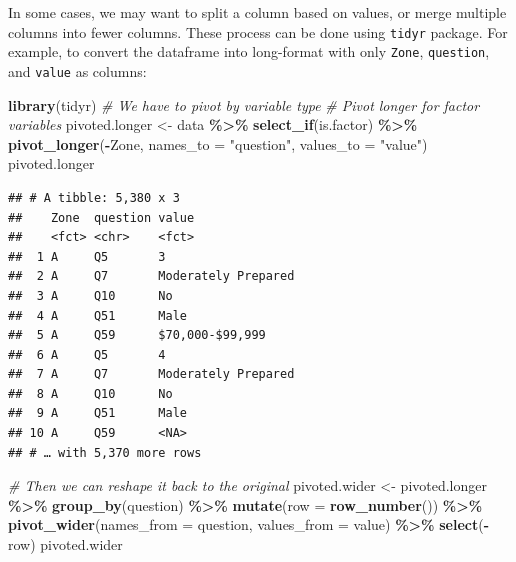 \documentclass[
]{book}
\newenvironment{Shaded}{\begin{snugshade}}{\end{snugshade}}
\newcommand{\CommentTok}[1]{\textcolor[rgb]{0.56,0.35,0.01}{\textit{#1}}}
\newcommand{\DataTypeTok}[1]{\textcolor[rgb]{0.13,0.29,0.53}{#1}}
\newcommand{\KeywordTok}[1]{\textcolor[rgb]{0.13,0.29,0.53}{\textbf{#1}}}
\newcommand{\NormalTok}[1]{#1}
\newcommand{\OperatorTok}[1]{\textcolor[rgb]{0.81,0.36,0.00}{\textbf{#1}}}
\newcommand{\StringTok}[1]{\textcolor[rgb]{0.31,0.60,0.02}{#1}}
\begin{document}
In some cases, we may want to split a column based on values, or merge multiple columns into fewer columns. These process can be done using \texttt{tidyr} package. For example, to convert the dataframe into long-format with only \texttt{Zone}, \texttt{question}, and \texttt{value} as columns:

\begin{Shaded}
\begin{Highlighting}[]
\KeywordTok{library}\NormalTok{(tidyr)}
\CommentTok{\# We have to pivot by variable type}
\CommentTok{\# Pivot longer for factor variables}
\NormalTok{pivoted.longer \textless{}{-}}\StringTok{ }\NormalTok{data }\OperatorTok{\%\textgreater{}\%}\StringTok{ }
\StringTok{  }\KeywordTok{select\_if}\NormalTok{(is.factor) }\OperatorTok{\%\textgreater{}\%}\StringTok{ }
\StringTok{  }\KeywordTok{pivot\_longer}\NormalTok{(}\OperatorTok{{-}}\NormalTok{Zone, }\DataTypeTok{names\_to =} \StringTok{"question"}\NormalTok{, }\DataTypeTok{values\_to =} \StringTok{"value"}\NormalTok{)}
\NormalTok{pivoted.longer}
\end{Highlighting}
\end{Shaded}

\begin{verbatim}
## # A tibble: 5,380 x 3
##    Zone  question value              
##    <fct> <chr>    <fct>              
##  1 A     Q5       3                  
##  2 A     Q7       Moderately Prepared
##  3 A     Q10      No                 
##  4 A     Q51      Male               
##  5 A     Q59      $70,000-$99,999    
##  6 A     Q5       4                  
##  7 A     Q7       Moderately Prepared
##  8 A     Q10      No                 
##  9 A     Q51      Male               
## 10 A     Q59      <NA>               
## # … with 5,370 more rows
\end{verbatim}

\begin{Shaded}
\begin{Highlighting}[]
\CommentTok{\# Then we can reshape it back to the original}
\NormalTok{pivoted.wider \textless{}{-}}\StringTok{ }\NormalTok{pivoted.longer }\OperatorTok{\%\textgreater{}\%}
\StringTok{  }\KeywordTok{group\_by}\NormalTok{(question) }\OperatorTok{\%\textgreater{}\%}\StringTok{ }\KeywordTok{mutate}\NormalTok{(}\DataTypeTok{row =} \KeywordTok{row\_number}\NormalTok{()) }\OperatorTok{\%\textgreater{}\%}\StringTok{ }
\StringTok{  }\KeywordTok{pivot\_wider}\NormalTok{(}\DataTypeTok{names\_from =}\NormalTok{ question, }\DataTypeTok{values\_from =}\NormalTok{ value) }\OperatorTok{\%\textgreater{}\%}\StringTok{ }
\StringTok{  }\KeywordTok{select}\NormalTok{(}\OperatorTok{{-}}\NormalTok{row)}
\NormalTok{pivoted.wider}
\end{Highlighting}
\end{Shaded}
\end{document}
